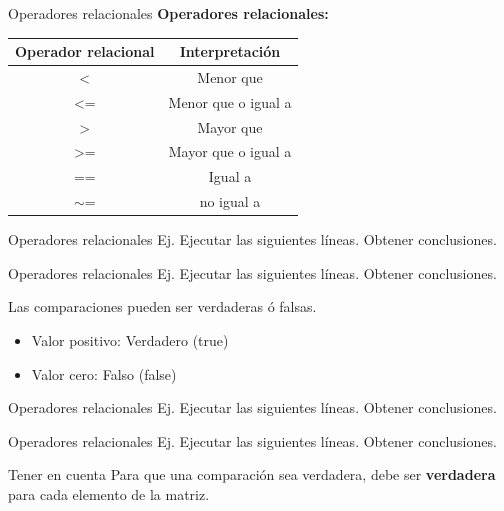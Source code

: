 \documentclass{bredelebeamer}
\begin{document}
\begin{frame}{Operadores relacionales}
\textbf{Operadores relacionales:}
\begin{table}[]
\centering
\begin{tabular}{|c|c|}
\hline
Operador relacional & Interpretación      \\ \hline
\textless{}         & Menor que           \\ \hline
\textless{}=        & Menor que o igual a \\ \hline
\textgreater{}      & Mayor que           \\ \hline
\textgreater{}=     & Mayor que o igual a \\ \hline
==                  & Igual a             \\ \hline
$\sim$=             & no igual a          \\ \hline
\end{tabular}
\end{table}
\end{frame}

\begin{frame}{Operadores relacionales}
Ej. Ejecutar las siguientes líneas. Obtener conclusiones.
 
\end{frame}

\begin{frame}{Operadores relacionales}
Ej. Ejecutar las siguientes líneas. Obtener conclusiones.
 
Las comparaciones pueden ser verdaderas ó falsas. 
\begin{itemize}
\item Valor positivo: Verdadero (true)
\item Valor cero: Falso (false)
\end{itemize}
\end{frame}

\begin{frame}{Operadores relacionales}
Ej. Ejecutar las siguientes líneas. Obtener conclusiones.
 
\end{frame}

\begin{frame}{Operadores relacionales}
Ej. Ejecutar las siguientes líneas. Obtener conclusiones.

\begin{alertblock}{Tener en cuenta}
Para que una comparación sea verdadera, debe ser \textbf{verdadera} para cada elemento de la matriz.
\end{alertblock}
\end{frame}
\end{document}

